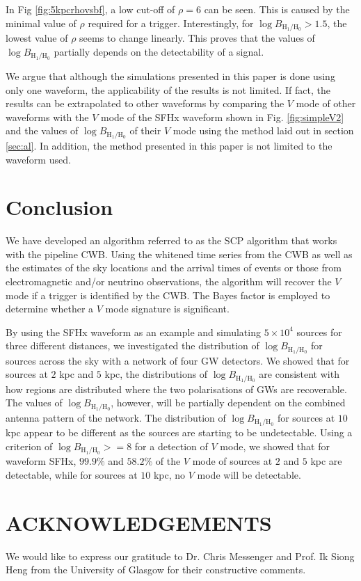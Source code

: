 \documentclass[aps,twocolumn,showpacs,groupedaddress, nofootinbib]{revtex4}  %
\begin{document}
In Fig \ref{fig:5kpcrhovsbf}, a low cut-off of $\rho = 6$ can be seen. 
This is caused by the minimal value of $\rho$ required for a trigger.  
Interestingly, for $\log B_{\text{H}_1 / \text{H}_0} > 1.5$, the lowest value of $\rho$ seems to change linearly. 
This proves that the values of $\log B_{\text{H}_1 / \text{H}_0}$ partially depends on the detectability of a signal.

We argue that although the simulations presented in this paper is done using only one waveform, the applicability of the results is not limited. 
If fact, the results can be extrapolated to other waveforms by comparing the $V$ mode of other waveforms with the $V$ mode of the SFHx waveform shown in Fig. \ref{fig:simpleV2}
and the values of $\log B_{\text{H}_1 / \text{H}_0}$ of their $V$ mode using the method laid out in section \ref{sec:al}.
In addition, the method presented in this paper is not limited to the waveform used.

\section{Conclusion}\label{sec:conclusion}
We have developed an algorithm referred to as the \ac{SCP} algorithm that works with the pipeline \ac{CWB}.
Using the whitened time series from the \ac{CWB} as well as the 
estimates of the sky locations and the arrival times of events or those from electromagnetic and/or neutrino observations,
the algorithm will recover the $V$ mode if a trigger is identified by the \ac{CWB}. 
The Bayes factor is employed to determine whether a $V$ mode signature is significant. 

By using the SFHx waveform as an example and simulating $5\times10^4$ sources for three different distances, 
we investigated the distribution of $\log B_{\text{H}_1 / \text{H}_0}$  for sources across the sky with a network of four \ac{GW} detectors.
We showed that for sources at $2$ kpc and $5$ kpc, the distributions of $\log B_{\text{H}_1 / \text{H}_0}$
are consistent with how regions are distributed where the two polarisations of \acp{GW} are recoverable.
The values of $\log B_{\text{H}_1 / \text{H}_0}$, however, will be partially dependent on the combined antenna pattern of the network.
The distribution of $\log B_{\text{H}_1 / \text{H}_0}$ for sources at $10$ kpc appear to be different as the sources are starting to be undetectable.
Using a criterion of $\log B_{\text{H}_1 / \text{H}_0} >=8 $ for a detection of $V$ mode, we showed that for waveform SFHx, $99.9\%$ and $58.2\%$
of the $V$ mode of sources at $2$ and $5$ kpc are detectable, while for sources at $10$ kpc, no $V$ mode will be detectable.


\section{ACKNOWLEDGEMENTS}
We would like to express our gratitude to Dr. Chris Messenger and  Prof. Ik Siong Heng 
from the University of Glasgow for their constructive comments.


\end{document}
